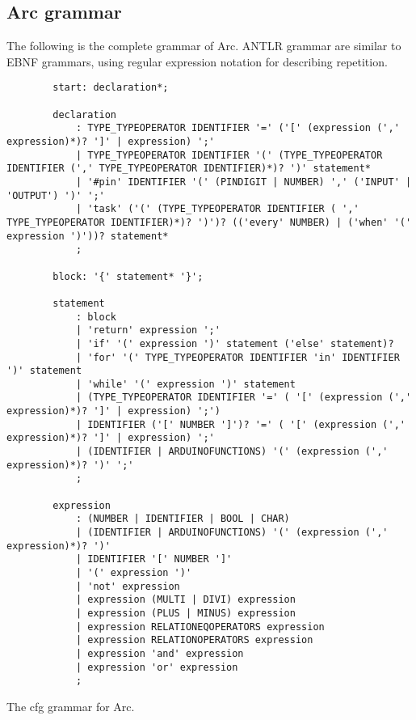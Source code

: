 \subsection{Arc grammar}\label{sec:arcgrammar}
The following is the complete grammar of Arc. ANTLR grammar are similar to EBNF grammars, using regular expression notation for describing repetition.

\begin{listing}[htb!]
    \begin{verbatim}
        start: declaration*;

        declaration
            : TYPE_TYPEOPERATOR IDENTIFIER '=' ('[' (expression (',' expression)*)? ']' | expression) ';'
            | TYPE_TYPEOPERATOR IDENTIFIER '(' (TYPE_TYPEOPERATOR IDENTIFIER (',' TYPE_TYPEOPERATOR IDENTIFIER)*)? ')' statement*
            | '#pin' IDENTIFIER '(' (PINDIGIT | NUMBER) ',' ('INPUT' | 'OUTPUT') ')' ';'
            | 'task' ('(' (TYPE_TYPEOPERATOR IDENTIFIER ( ',' TYPE_TYPEOPERATOR IDENTIFIER)*)? ')')? (('every' NUMBER) | ('when' '(' expression ')'))? statement*
            ;

        block: '{' statement* '}';

        statement
            : block
            | 'return' expression ';'
            | 'if' '(' expression ')' statement ('else' statement)?
            | 'for' '(' TYPE_TYPEOPERATOR IDENTIFIER 'in' IDENTIFIER ')' statement
            | 'while' '(' expression ')' statement
            | (TYPE_TYPEOPERATOR IDENTIFIER '=' ( '[' (expression (',' expression)*)? ']' | expression) ';')
            | IDENTIFIER ('[' NUMBER ']')? '=' ( '[' (expression (',' expression)*)? ']' | expression) ';'
            | (IDENTIFIER | ARDUINOFUNCTIONS) '(' (expression (',' expression)*)? ')' ';'
            ;

        expression
            : (NUMBER | IDENTIFIER | BOOL | CHAR)
            | (IDENTIFIER | ARDUINOFUNCTIONS) '(' (expression (',' expression)*)? ')'
            | IDENTIFIER '[' NUMBER ']'
            | '(' expression ')'
            | 'not' expression
            | expression (MULTI | DIVI) expression
            | expression (PLUS | MINUS) expression
            | expression RELATIONEQOPERATORS expression
            | expression RELATIONOPERATORS expression
            | expression 'and' expression
            | expression 'or' expression
            ;
    \end{verbatim}
    \caption{The \gls{cfg} grammar for Arc.}
    \label{lst:arccfg}
\end{listing}




